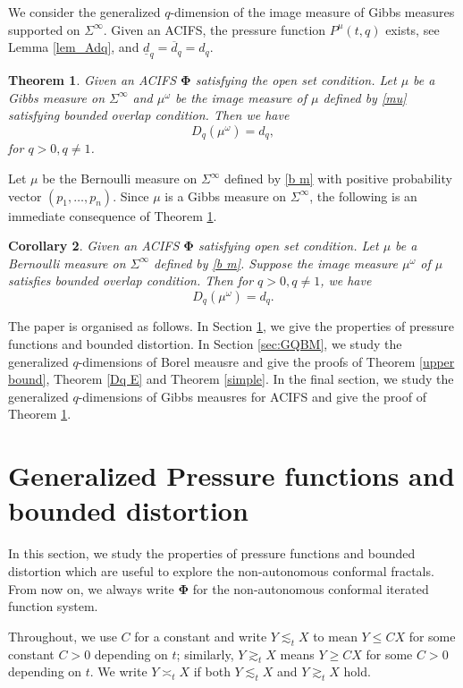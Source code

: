 \documentclass[12pt]{amsart}
\theoremstyle{plain}
\newtheorem{thm}{Theorem}[section]
\newtheorem{cor}[thm]{Corollary}
\theoremstyle{definition}
\theoremstyle{remark}
\begin{document}
We consider the generalized $q$-dimension of the image measure of Gibbs measures supported on $\Sigma^\infty$. Given an  ACIFS, the pressure function $P^\mu(t, q)$ exists, see Lemma \ref{lem_Adq}, and $\underline{d}_q=\overline{d}_q=d_q$.
\begin{thm}\label{thm_HNCIFS}
Given an  ACIFS $\boldsymbol{\Phi}$ satisfying the open set condition. Let $\mu$ be a Gibbs measure on $\Sigma^\infty$ and $\mu^\omega$ be the image measure of $\mu$ defined by \eqref{mu} satisfying bounded overlap condition. Then we have 
$$
{D}_q(\mu^\omega)=d_q,
$$
for $q>0, q\neq 1$. 
\end{thm}



Let $\mu$ be the Bernoulli measure on $\Sigma^\infty$ defined by \eqref{b m} with positive probability vector $(p_1, \ldots, p_n)$. Since $\mu$ is a Gibbs measure on $\Sigma^\infty$,   the following is an immediate consequence of Theorem \ref{thm_HNCIFS}.



\begin{cor}
Given an ACIFS $\boldsymbol{\Phi}$ satisfying open set condition.  Let $\mu$ be a Bernoulli measure on $\Sigma^\infty$ defined by \eqref{b m}. Suppose the image measure  $\mu^\omega$  of $\mu$ satisfies  bounded overlap condition. Then for $q>0, q\not=1$,  we have
$$
{D}_q(\mu^\omega)=d_q.
$$
\end{cor}

The paper is organised as follows. In Section \ref{sec:GRFBD}, we give the properties of pressure functions and bounded distortion.
In Section \ref{sec:GQBM},  we study the generalized $q$-dimensions of Borel meausre and give the proofs of Theorem \ref{upper bound},  Theorem \ref{Dq E} and  Theorem \ref{simple}. In the final section, we study the generalized $q$-dimensions of Gibbs meausres for ACIFS and give the proof of Theorem \ref{thm_HNCIFS}.


\section{Generalized Pressure functions and bounded distortion}\label{sec:GRFBD}
In this section, we study the properties of pressure functions and bounded distortion which  are  useful to explore  the  non-autonomous conformal fractals.
From now on, we always  write $\boldsymbol{\Phi}$ for the non-autonomous conformal iterated function system.



Throughout, we use $C$ for a constant and write $Y \lesssim_t X$ to mean $Y \le C X$ for some constant $C > 0$ depending on $t$; similarly, $Y \gtrsim_t X$ means $Y \ge C X$ for some $C> 0$ depending on $t$. We write $Y \asymp_t X$ if both $Y \lesssim_t X$ and $Y \gtrsim_t X$ hold.
\end{document}
